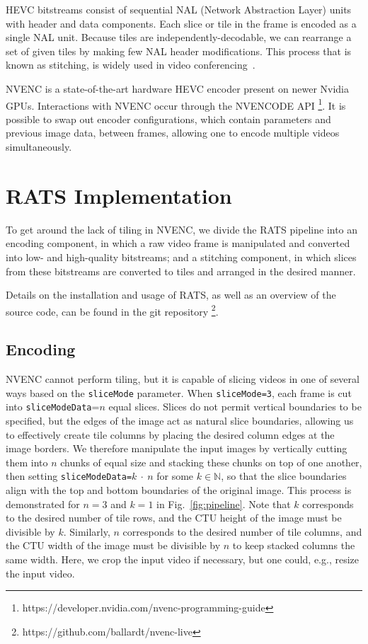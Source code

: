 HEVC bitstreams consist of sequential NAL (Network Abstraction Layer) units with header and data components. Each slice or tile in the frame is encoded as a single NAL unit. Because tiles are independently-decodable, we can rearrange a set of given tiles by making few NAL header modifications. This process that is known as stitching, is widely used in video conferencing~\cite{amon2012,feldmann2013,delafuente2017}.

NVENC is a state-of-the-art hardware HEVC encoder present on newer Nvidia GPUs. Interactions with NVENC occur through the NVENCODE API \footnote{https://developer.nvidia.com/nvenc-programming-guide}. It is possible to swap out encoder configurations, which contain parameters and previous image data, between frames, allowing one to encode multiple videos simultaneously.

\section{RATS Implementation} \label{rats}
To get around the lack of tiling in NVENC, we divide the RATS pipeline into an encoding component, in which a raw video frame is manipulated and converted into low- and high-quality bitstreams; and a stitching component, in which slices from these bitstreams are converted to tiles and arranged in the desired manner.

Details on the installation and usage of RATS, as well as an overview of the source code, can be found in the git repository \footnote{https://github.com/ballardt/nvenc-live}.

\subsection{Encoding}

NVENC cannot perform tiling, but it is capable of slicing videos in one of several ways based on the \texttt{sliceMode} parameter. When \texttt{sliceMode=3}, each frame is cut into \texttt{sliceModeData}=$n$ equal slices. Slices do not permit vertical boundaries to be specified, but the edges of the image act as natural slice boundaries, allowing us to effectively create tile columns by placing the desired column edges at the image borders. We therefore manipulate the input images by vertically cutting them into $n$ chunks of equal size and stacking these chunks on top of one another, then setting \texttt{sliceModeData=}$k~\cdot~n$ for some $k \in \mathbb{N}$, so that the slice boundaries align with the top and bottom boundaries of the original image. This process is demonstrated for $n=3$ and $k=1$ in Fig.~\ref{fig:pipeline}. Note that $k$ corresponds to the desired number of tile rows, and the CTU height of the image must be divisible by $k$. Similarly, $n$ corresponds to the desired number of tile columns, and the CTU width of the image must be divisible by $n$ to keep stacked columns the same width. Here, we crop the input video if necessary, but one could, e.g., resize the input video.

